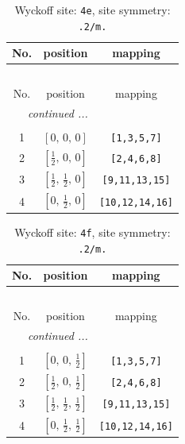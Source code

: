 \documentclass[fleqn,8pt]{jsarticle}
\begin{document}
\renewcommand{\arraystretch}{1.2}
\begin{longtable}{ccc}
\caption{Wyckoff site: {\tt 4e}, site symmetry: {\tt .2/m.}}
 \\
 \hline \hline
No. & position & mapping \\ \hline \endfirsthead

\multicolumn{2}{l}{\tablename\ \thetable{}} \\
 \hline \hline
No. & position & mapping \\ \hline \endhead

 \hline \hline
\multicolumn{2}{r}{\footnotesize\it continued ...} \\ \endfoot

 \hline \hline
\multicolumn{2}{r}{} \\ \endlastfoot

1 & $\left[ 0,\, 0,\, 0 \right]$ & {\tt [1,3,5,7]} \\ \hline
2 & $\left[ \frac{1}{2},\, 0,\, 0 \right]$ & {\tt [2,4,6,8]} \\ \hline
3 & $\left[ \frac{1}{2},\, \frac{1}{2},\, 0 \right]$ & {\tt [9,11,13,15]} \\ \hline
4 & $\left[ 0,\, \frac{1}{2},\, 0 \right]$ & {\tt [10,12,14,16]} \\
\end{longtable}
\renewcommand{\arraystretch}{1.2}
\begin{longtable}{ccc}
\caption{Wyckoff site: {\tt 4f}, site symmetry: {\tt .2/m.}}
 \\
 \hline \hline
No. & position & mapping \\ \hline \endfirsthead

\multicolumn{2}{l}{\tablename\ \thetable{}} \\
 \hline \hline
No. & position & mapping \\ \hline \endhead

 \hline \hline
\multicolumn{2}{r}{\footnotesize\it continued ...} \\ \endfoot

 \hline \hline
\multicolumn{2}{r}{} \\ \endlastfoot

1 & $\left[ 0,\, 0,\, \frac{1}{2} \right]$ & {\tt [1,3,5,7]} \\ \hline
2 & $\left[ \frac{1}{2},\, 0,\, \frac{1}{2} \right]$ & {\tt [2,4,6,8]} \\ \hline
3 & $\left[ \frac{1}{2},\, \frac{1}{2},\, \frac{1}{2} \right]$ & {\tt [9,11,13,15]} \\ \hline
4 & $\left[ 0,\, \frac{1}{2},\, \frac{1}{2} \right]$ & {\tt [10,12,14,16]} \\
\end{longtable}
\end{document}
